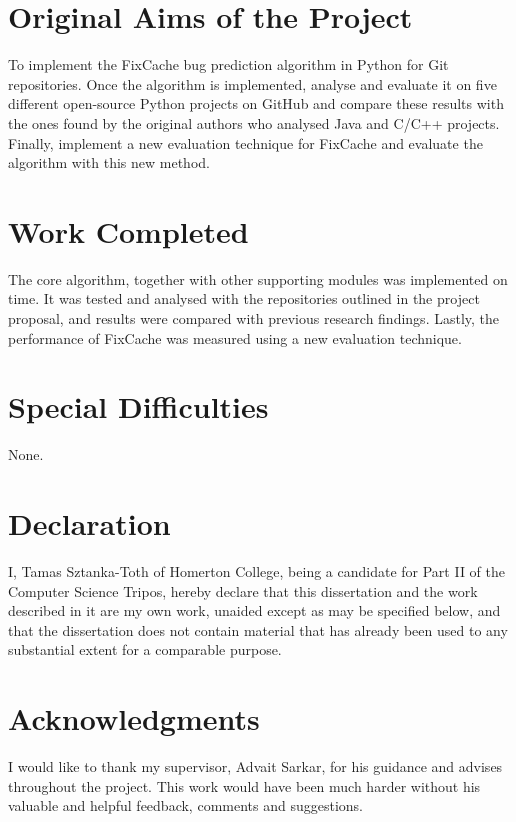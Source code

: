 \documentclass[12pt,twoside,notitlepage]{report}
\newcommand{\fxch}{FixCache}
\begin{document}
\section*{Original Aims of the Project}
To implement the \fxch{} bug prediction algorithm in Python for Git repositories.  Once the algorithm is implemented, analyse and evaluate it on five different open-source Python projects on GitHub and compare these results with the ones found by the original authors who analysed Java and C/C++ projects. Finally, implement a new evaluation technique for \fxch{} and evaluate the algorithm with this new method.
\clearpage
\section*{Work Completed}
The core algorithm, together with other supporting modules was implemented on time. It was tested and analysed with the repositories outlined in the project proposal, and results were compared with previous research findings. Lastly, the performance of \fxch{} was measured using a new evaluation technique.

\section*{Special Difficulties}
None.
 
\newpage
\section*{Declaration}

I, Tamas Sztanka-Toth of Homerton College, being a candidate for Part II of the Computer
Science Tripos, hereby declare
that this dissertation and the work described in it are my own work,
unaided except as may be specified below, and that the dissertation
does not contain material that has already been used to any substantial
extent for a comparable purpose.

\bigskip
{}

\medskip
{}

\cleardoublepage

\tableofcontents

\listoffigures

\newpage
\section*{Acknowledgments}
I would like to thank my supervisor, Advait Sarkar, for his guidance and advises throughout the project. This work would have been much harder without his valuable and helpful feedback, comments and suggestions.
\end{document}

